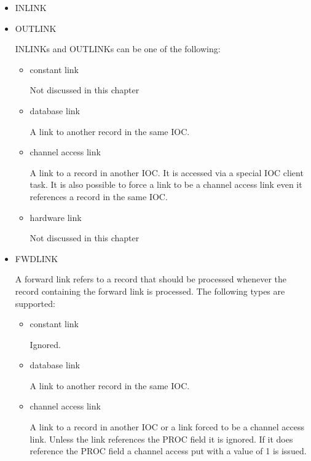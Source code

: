 \begin{itemize}
\item {}INLINK
\item {}OUTLINK

INLINKs and OUTLINKs can be one of the following:

\begin{itemize}
\item {} constant link

Not discussed in this chapter

\item {}database link

A link to another record in the same IOC.

\item {}channel access link

A link to a record in another IOC.
It is accessed via a special IOC client task.
It is also possible to force a link to be a channel access link even it references a record in the same IOC.

\item hardware link

Not discussed in this chapter

\end{itemize}

\item {}FWDLINK

A forward link refers to a record that should be processed whenever the record containing the forward link is processed.
The following types are supported:

\begin{itemize}

\item constant link

Ignored.

\item database link

A link to another record in the same IOC.

\item channel access link

A link to a record in another IOC or a link forced to be a channel access link.
Unless the link references the PROC field it is ignored.
If it does reference the PROC field a channel access put with a value of 1 is issued.

\end{itemize}
\end{itemize}


